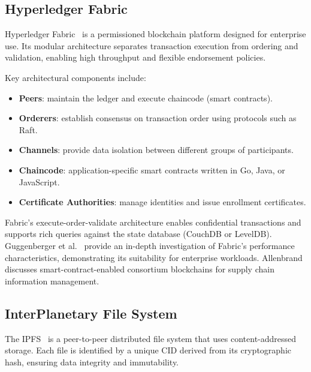 \subsection{Hyperledger Fabric}
\label{subsec:fabric}

Hyperledger Fabric~\cite{androulaki:barger:bortnikov:etal:2018} is a permissioned blockchain platform designed for enterprise use.
Its modular architecture separates transaction execution from ordering and validation, enabling high throughput and flexible endorsement policies.

Key architectural components include:
\begin{itemize}
    \item \textbf{Peers}: maintain the ledger and execute chaincode (smart contracts).
    \item \textbf{Orderers}: establish consensus on transaction order using protocols such as Raft.
    \item \textbf{Channels}: provide data isolation between different groups of participants.
    \item \textbf{Chaincode}: application-specific smart contracts written in Go, Java, or JavaScript.
    \item \textbf{Certificate Authorities}: manage identities and issue enrollment certificates.
\end{itemize}

Fabric's execute-order-validate architecture enables confidential transactions and supports rich queries against the state database (CouchDB or LevelDB).
Guggenberger et al.~\cite{guggenberger:sedlmeir:fridgen:etal:2022} provide an in-depth investigation of Fabric's performance characteristics, demonstrating its suitability for enterprise workloads.
Allenbrand~\cite{allenbrand:2023} discusses smart-contract-enabled consortium blockchains for supply chain information management.

\subsection{InterPlanetary File System}
\label{subsec:ipfs}

The \ac{IPFS}~\cite{benet:2014} is a peer-to-peer distributed file system that uses content-addressed storage.
Each file is identified by a unique \ac{CID} derived from its cryptographic hash, ensuring data integrity and immutability.

